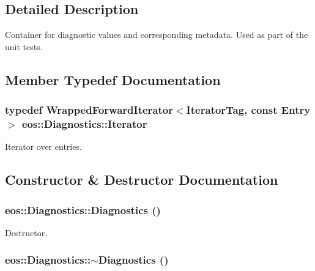 \subsection{Detailed Description}
Container for diagnostic values and corresponding metadata. Used as part of the unit tests. 

\subsection{Member Typedef Documentation}
\hypertarget{classeos_1_1Diagnostics_a53e47703a0b60c37caf9cc2f29606692}{
\subsubsection[{Iterator}]{\setlength{\rightskip}{0pt plus 5cm}typedef {\bf WrappedForwardIterator}$<$IteratorTag, const {\bf Entry}$>$ {\bf eos::Diagnostics::Iterator}}}
\label{classeos_1_1Diagnostics_a53e47703a0b60c37caf9cc2f29606692}


Iterator over entries. 

\subsection{Constructor \& Destructor Documentation}
\hypertarget{classeos_1_1Diagnostics_aeff0c4ba0db58891ead8bc4e5a17d075}{
\subsubsection[{Diagnostics}]{\setlength{\rightskip}{0pt plus 5cm}eos::Diagnostics::Diagnostics ()}}
\label{classeos_1_1Diagnostics_aeff0c4ba0db58891ead8bc4e5a17d075}


Destructor. \hypertarget{classeos_1_1Diagnostics_a95753f31bc63bad2b51b8699be04f01d}{
\subsubsection[{$\sim$Diagnostics}]{\setlength{\rightskip}{0pt plus 5cm}eos::Diagnostics::$\sim$Diagnostics ()}}
\label{classeos_1_1Diagnostics_a95753f31bc63bad2b51b8699be04f01d}


